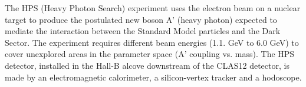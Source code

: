 The HPS (Heavy Photon Search) experiment uses the electron beam on a nuclear target to produce the postulated new boson A' (heavy photon) expected to mediate the interaction between the Standard Model particles and the Dark Sector. The experiment requires different beam energies (1.1. GeV to 6.0 GeV) to cover unexplored areas in the parameter space (A' coupling vs. mass). The HPS detector, installed in the Hall-B alcove downstream of the CLAS12 detector, is made by an electromagnetic calorimeter, a silicon-vertex tracker and a hodoscope.
\\

